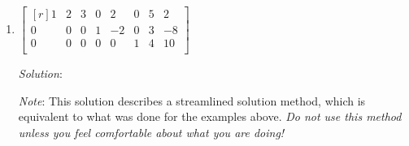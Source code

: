 \documentclass[12pt]{article}
\begin{document}
\begin{enumerate}
\[+\lambda_1\begin{bmatrix*}[r] -2\\ 1\\ 0\\ 0\end{bmatrix*}
+\lambda_2\begin{bmatrix*}[r] -3\\ 0\\ 1\\ 0\end{bmatrix*}
+\lambda_3\begin{bmatrix*}[r] -4\\ 0\\ 0\\ 1\end{bmatrix*}
\;:\;
\lambda_1,\lambda_2,\lambda_3\in\R\right\}
\]

\bigskip
\item
$\begin{bmatrix*}[r]
1 & 2 & 3 & 0 & 2  & 0 & 5 & 2\\
0 & 0 & 0 & 1 & -2 & 0 & 3 & -8\\
0 & 0 & 0 & 0 & 0  & 1 & 4 & 10\\
\end{bmatrix*}$

\emph{Solution}:

\emph{Note}: This solution describes a streamlined solution method, which is equivalent to what was done for the examples above. \emph{Do not use this method unless you feel comfortable about what you are doing!}


\end{enumerate}
\end{document}
